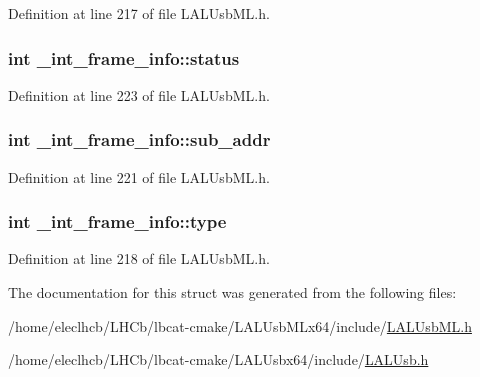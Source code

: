 Definition at line 217 of file LALUsbML.h.\hypertarget{struct__int__frame__info_a0d9006b1b5b9fd5a5576e1cdb7e88c5b}{
\subsubsection[{status}]{\setlength{\rightskip}{0pt plus 5cm}int {\bf \_\-int\_\-frame\_\-info::status}}}
\label{struct__int__frame__info_a0d9006b1b5b9fd5a5576e1cdb7e88c5b}


Definition at line 223 of file LALUsbML.h.\hypertarget{struct__int__frame__info_a97675d320269c758fdb640e1a935af66}{
\subsubsection[{sub\_\-addr}]{\setlength{\rightskip}{0pt plus 5cm}int {\bf \_\-int\_\-frame\_\-info::sub\_\-addr}}}
\label{struct__int__frame__info_a97675d320269c758fdb640e1a935af66}


Definition at line 221 of file LALUsbML.h.\hypertarget{struct__int__frame__info_a4c4c7c961ca654d25894f2712acf8082}{
\subsubsection[{type}]{\setlength{\rightskip}{0pt plus 5cm}int {\bf \_\-int\_\-frame\_\-info::type}}}
\label{struct__int__frame__info_a4c4c7c961ca654d25894f2712acf8082}


Definition at line 218 of file LALUsbML.h.

The documentation for this struct was generated from the following files:\begin{DoxyCompactItemize}
\item 
/home/eleclhcb/LHCb/lbcat-\/cmake/LALUsbMLx64/include/\hyperlink{LALUsbML_8h}{LALUsbML.h}\item 
/home/eleclhcb/LHCb/lbcat-\/cmake/LALUsbx64/include/\hyperlink{LALUsb_8h}{LALUsb.h}\end{DoxyCompactItemize}
